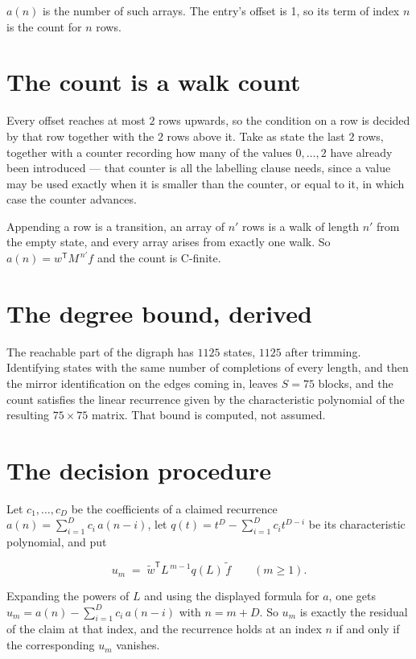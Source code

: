 \documentclass[11pt]{article}
\theoremstyle{definition}
\begin{document}
$a(n)$ is the number of such arrays. The entry's offset is 1, so its term of index $n$ is the count for $n$ rows.

\section{The count is a walk count}

Every offset reaches at most $2$ rows upwards, so the condition on a row is decided by that row together with the $2$ rows above it. Take as state the last $2$ rows, together with a counter recording how many of the values $0,\dots,2$ have already been introduced --- that counter is all the labelling clause needs, since a value may be used exactly when it is smaller than the counter, or equal to it, in which case the counter advances.

Appending a row is a transition, an array of $n'$ rows is a walk of length $n'$ from the empty state, and every array arises from exactly one walk. So $a(n) = w^{\mathsf T}M^{\,n'}f$ and the count is C-finite.

\section{The degree bound, derived}

The reachable part of the digraph has $1125$ states, $1125$ after trimming. Identifying states with the same number of completions of every length, and then the mirror identification on the edges coming in, leaves $S = 75$ blocks, and the count satisfies the linear recurrence given by the characteristic polynomial of the resulting $75\times75$ matrix. That bound is computed, not assumed.

\section{The decision procedure}

Let $c_1,\dots,c_D$ be the coefficients of a claimed recurrence $a(n) = \sum_{i=1}^{D} c_i\,a(n-i)$, let $q(t) = t^{D} - \sum_{i=1}^{D} c_i t^{D-i}$ be its characteristic polynomial, and put

\[u_m \;=\; \tilde w^{\mathsf T} L^{\,m-1} q(L)\,\tilde f \qquad (m \ge 1).\]

Expanding the powers of $L$ and using the displayed formula for $a$, one gets $u_m = a(n) - \sum_{i=1}^{D} c_i\,a(n-i)$ with $n = m + D$. So $u_m$ is exactly the residual of the claim at that index, and the recurrence holds at an index $n$ if and only if the corresponding $u_m$ vanishes.
\end{document}
